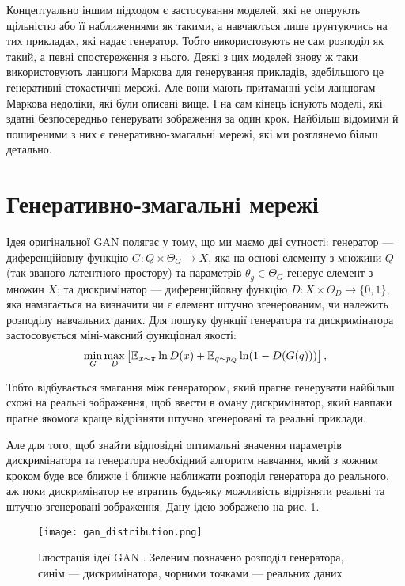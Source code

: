 Концептуально іншим підходом є застосування моделей, які
не оперують щільністю або її наближеннями як такими, а
навчаються лише ґрунтуючись на тих прикладах, які надає
генератор. Тобто використовують не сам розподіл як такий, а
певні спостереження з нього. Деякі з цих моделей знову ж таки
використовують ланцюги Маркова для генерування прикладів,
здебільшого це генеративні стохастичні мережі. Але вони мають
притаманні усім ланцюгам Маркова недоліки, які були описані вище.
І на сам кінець існують моделі, які здатні безпосередньо
генерувати зображення за один крок. Найбільш відомими й поширеними з них
є генеративно-змагальні мережі, які ми розглянемо більш детально.

\section{Генеративно-змагальні мережі}

Ідея оригінальної GAN  \cite{goodfellow2014generative}
полягає у тому, що ми маємо дві сутності:
генератор --- диференційовну функцію $G: Q \times \Theta_G \rightarrow X$, яка
на основі елементу з множини $Q$ (так званого латентного простору)
та параметрів $\theta_g \in \Theta_G$
генерує елемент з множин $X$; та дискримінатор
--- диференційовну функцію $D: X \times \Theta_D \rightarrow \{0, 1\}$, яка
намагається на визначити чи є елемент штучно згенерованим, чи
належить розподілу навчальних даних. Для пошуку функції
генератора та дискримінатора застосовується міні-максний функціонал якості:
\begin{equation} \label{eq:gan_criterion}
    \min\limits_{G}\max\limits_{D} \left[
        \operatorname{\mathbb{E}}_{x \sim \pi} \ln D(x) +
        \operatorname{\mathbb{E}}_{q \sim p_{Q}} \ln (1 - D(G(q))) \right],
\end{equation}

Тобто відбувається змагання між генератором, який прагне генерувати найбільш
схожі на реальні зображення, щоб ввести в оману дискримінатор,
який навпаки прагне якомога краще відрізняти штучно згенеровані та
реальні приклади.

Але для того, щоб знайти відповідні оптимальні значення
параметрів дискримінатора та генератора необхідний алгоритм навчання,
який з кожним кроком буде все ближче і ближче наближати розподіл
генератора до реального, аж поки дискримінатор не втратить будь-яку можливість
відрізняти реальні та штучно згенеровані зображення. Дану ідею
зображено на рис. \ref{fig:gan}.

\begin{figure}[h]
    \centering
    \texttt{[image: gan\_distribution.png]}
    \caption{Ілюстрація ідеї GAN \cite{goodfellow2014generative}.
        Зеленим позначено розподіл генератора,
        синім --- дискримінатора,
        чорними точками --- реальних даних}
    \label{fig:gan}
\end{figure}

